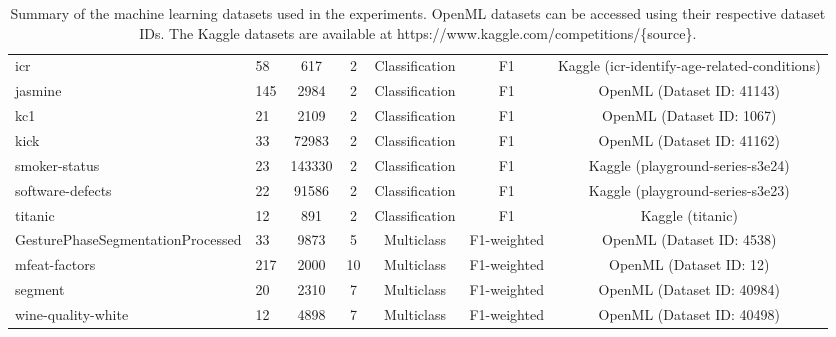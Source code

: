 \begin{table*}[h]
{\begin{tabular}{>{\scriptsize}p{}>{\scriptsize}p{}<{\centering}>{\scriptsize}c>{\scriptsize}c>{\scriptsize}c>{\scriptsize}c>{\scriptsize}c}
icr   & 58          & 617      & 2          & Classification & F1 & Kaggle  \scriptsize (icr-identify-age-related-conditions)     \\
jasmine                                   & 145         & 2984     & 2          & Classification & F1 & OpenML \scriptsize (Dataset ID: 41143)       \\
kc1                                       & 21          & 2109     & 2          & Classification & F1  & OpenML \scriptsize (Dataset ID: 1067)     \\
kick                                      & 33          & 72983    & 2          & Classification & F1  & OpenML \scriptsize (Dataset ID: 41162)     \\
smoker-status                             & 23          & 143330   & 2          & Classification & F1  & Kaggle \scriptsize (playground-series-s3e24)     \\
software-defects                          & 22          & 91586    & 2          & Classification & F1  & Kaggle \scriptsize (playground-series-s3e23)     \\
titanic                                   & 12          & 891      & 2          & Classification & F1  & Kaggle \scriptsize (titanic)    \\
GesturePhaseSegmentationProcessed      & 33          & 9873     & 5          & Multiclass & F1-weighted & OpenML \scriptsize (Dataset ID: 4538) \\

mfeat-factors                             & 217         & 2000     & 10         & Multiclass & F1-weighted  & OpenML \scriptsize (Dataset ID: 12)\\


segment                                   & 20          & 2310     & 7          & Multiclass & F1-weighted & OpenML \scriptsize (Dataset ID: 40984) \\
wine-quality-white                      & 12          & 4898     & 7          & Multiclass & F1-weighted & OpenML \scriptsize (Dataset ID: 40498) \\
\bottomrule
\hline
\end{tabular}
}
\caption{Summary of the machine learning datasets used in the experiments. OpenML datasets can be accessed using their respective dataset IDs. The Kaggle datasets are available at https://www.kaggle.com/competitions/\{source\}.}
\label{table:datasets}
\end{table*}
